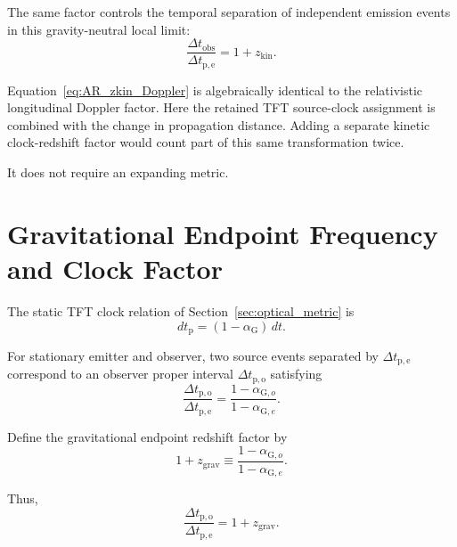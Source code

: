 The same factor controls the temporal separation of independent emission
events in this gravity-neutral local limit:
\begin{equation}
    \boxed{
    \frac{
        \Delta t_{\mathrm{obs}}
    }{
        \Delta t_{\mathrm{p,e}}
    }
    =
    1+z_{\mathrm{kin}}.
    }
    \label{eq:AR_time_dilation_kin}
\end{equation}

Equation~\eqref{eq:AR_zkin_Doppler} is algebraically identical to the
relativistic longitudinal Doppler factor. Here the retained TFT source-clock
assignment is combined with the change in propagation distance. Adding a
separate kinetic clock-redshift factor would count part of this same
transformation twice.

It does not require an expanding metric.


\section{Gravitational Endpoint Frequency and Clock Factor}

The static TFT clock relation of Section~\ref{sec:optical_metric} is
\begin{equation}
    dt_{\mathrm p}
    =
    (1-\alpha_{\mathrm G})\,dt.
    \label{eq:AR_gravitational_clock}
\end{equation}

For stationary emitter and observer, two source events separated by
\(\Delta t_{\mathrm{p,e}}\) correspond to an observer proper interval
\(\Delta t_{\mathrm{p,o}}\) satisfying
\begin{equation}
    \frac{
        \Delta t_{\mathrm{p,o}}
    }{
        \Delta t_{\mathrm{p,e}}
    }
    =
    \frac{
        1-\alpha_{\mathrm G,o}
    }{
        1-\alpha_{\mathrm G,e}
    }.
    \label{eq:AR_gravitational_clock_ratio}
\end{equation}

Define the gravitational endpoint redshift factor by
\begin{equation}
    \boxed{
    1+z_{\mathrm{grav}}
    \equiv
    \frac{
        1-\alpha_{\mathrm G,o}
    }{
        1-\alpha_{\mathrm G,e}
    }.
    }
    \label{eq:AR_zgrav}
\end{equation}

Thus,
\begin{equation}
    \boxed{
    \frac{
        \Delta t_{\mathrm{p,o}}
    }{
        \Delta t_{\mathrm{p,e}}
    }
    =
    1+z_{\mathrm{grav}}.
    }
    \label{eq:AR_time_dilation_grav}
\end{equation}

